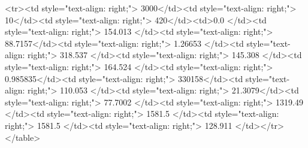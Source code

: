 <tr><td style="text-align: right;">      3000</td><td style="text-align: right;">        10</td><td style="text-align: right;">           420</td><td>0.0          </td><td style="text-align: right;">               154.013 </td><td style="text-align: right;">            88.7157</td><td style="text-align: right;">         1.26653 </td><td style="text-align: right;">        318.537 </td><td style="text-align: right;">           145.308 </td><td style="text-align: right;">             164.524   </td><td style="text-align: right;">             0.985835</td><td style="text-align: right;">              330158</td><td style="text-align: right;">                      110.053 </td><td style="text-align: right;">            21.3079</td><td style="text-align: right;">                77.7002 </td><td style="text-align: right;">      1319.49  </td><td style="text-align: right;">   1581.5  </td><td style="text-align: right;">      1581.5  </td><td style="text-align: right;">                128.911 </td></tr>
</table>